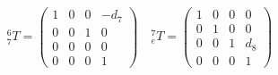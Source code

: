 \begin{gather}
    ^6_7 T = \begin{pmatrix}
        1 & 0 & 0 & -d_7 \\
        0 & 0 & 1 & 0 \\
        0 & 0 & 0 & 0 \\
        0 & 0 & 0 & 1
    \end{pmatrix} \quad
    ^7_e T = \begin{pmatrix}
        1 & 0 & 0 & 0 \\
        0 & 1 & 0 & 0 \\
        0 & 0 & 1 & d_8 \\
        0 & 0 & 0 & 1
    \end{pmatrix} \nonumber
\end{gather}